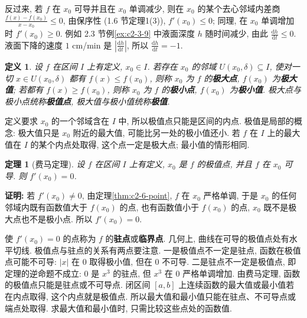 \documentclass[UTF8,openany]{ctexbook}
\theoremstyle{chinesetextbook}
\newtheorem{definition}{定义}[section]
\newtheorem{theorem}{定理}[section]
\newenvironment{cnproof}{\par\indent\textbf{证明:} \ignorespaces}{\par}
\newcommand{\dd}{\mathrm d}
\begin{document}
反过来, 若 $f$ 在 $x_0$ 可导并且在 $x_0$ 单调减少, 则在 $x_0$ 的某个去心邻域内差商 $\displaystyle\frac{f(x)-f(x_0)}{x-x_0}\le0$, 由保序性 (1.6 节定理1(3)), $f'(x_0)\le0$; 同理, 在 $x_0$ 单调增加时 $f'(x_0)\ge0$. 例如 2.3 节例\ref{ex:c2-3-9} 中液面深度 $h$ 随时间减少, 由此 $\displaystyle\frac{\dd h}{\dd t}\le0$. 液面下降的速度 $1$ cm/min 是 $\displaystyle\left|\frac{\dd h}{\dd t}\right|$, 所以 $\displaystyle\frac{\dd h}{\dd t}=-1$.
\begin{definition}
设 $f$ 在区间 $I$ 上有定义, $x_0\in I$. 若存在 $x_0$ 的邻域 $U(x_0,\delta)\subseteq I$, 使对一切 $x\in U(x_0,\delta)$ 都有 $f(x)\le f(x_0)$, 则称 $x_0$ 为 $f$ 的\textbf{极大点}, $f(x_0)$ 为\textbf{极大值}; 若都有 $f(x)\ge f(x_0)$, 则称 $x_0$ 为 $f$ 的\textbf{极小点}, $f(x_0)$ 为\textbf{极小值}. 极大点与极小点统称\textbf{极值点}, 极大值与极小值统称\textbf{极值}.
\end{definition}
定义要求 $x_0$ 的一个邻域含在 $I$ 中, 所以极值点只能是区间的内点. 极值是局部的概念: 极大值只是 $x_0$ 附近的最大值, 可能比另一处的极小值还小. 若 $f$ 在 $I$ 上的最大值在 $I$ 的某个内点处取得, 这个点一定是极大点; 最小值的情形相同.
\begin{theorem}[费马定理]\label{thm:c2-6-fermat}
设 $f$ 在区间 $I$ 上有定义, $x_0$ 是 $f$ 的极值点, 并且 $f$ 在 $x_0$ 可导. 则 $f'(x_0)=0$.
\end{theorem}
\begin{cnproof}
若 $f'(x_0)\ne0$, 由定理\ref{thm:c2-6-point}, $f$ 在 $x_0$ 严格单调, 于是 $x_0$ 的任何邻域内既有函数值大于 $f(x_0)$ 的点, 也有函数值小于 $f(x_0)$ 的点, $x_0$ 既不是极大点也不是极小点. 所以 $f'(x_0)=0$.
\end{cnproof}
使 $f'(x_0)=0$ 的点称为 $f$ 的\textbf{驻点}或\textbf{临界点}. 几何上, 曲线在可导的极值点处有水平切线. 极值点与驻点的关系有两点要注意. 一是极值点不一定是驻点, 函数在极值点可能不可导: $|x|$ 在 $0$ 取得极小值, 但在 $0$ 不可导. 二是驻点不一定是极值点, 即定理的逆命题不成立: $0$ 是 $x^3$ 的驻点, 但 $x^3$ 在 $0$ 严格单调增加. 由费马定理, 函数的极值点只能是驻点或不可导点. 闭区间 $[a,b]$ 上连续函数的最大值或最小值若在内点取得, 这个内点就是极值点. 所以最大值和最小值只能在驻点、不可导点或端点处取得. 求最大值和最小值时, 只需比较这些点处的函数值.
\end{document}
